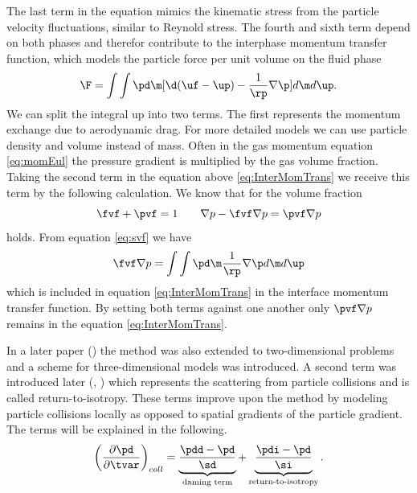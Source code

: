 The last term in the equation mimics the kinematic stress from the particle velocity fluctuations, similar to Reynold stress. The fourth and sixth term depend on both phases and therefor contribute to the interphase momentum transfer function, which models the particle force per unit volume on the fluid phase
\begin{equation}
    \label{eq:InterMomTrans}
    \F = \int \int \pd \m [\d (\uf - \up) - \dfrac{1}{\rp} \nabla \p] d\m d\up.
\end{equation}
We can split the integral up into two terms. The first represents the momentum exchange due to aerodynamic drag.
For more detailed models we can use particle density and volume instead of mass.
Often in the gas momentum equation \eqref{eq:momEul} the pressure gradient is multiplied by the gas volume fraction. Taking the second term in the equation above \eqref{eq:InterMomTrans} we receive this term by the following calculation.
We know that for the volume fraction
\begin{equation}
    \fvf + \pvf = 1 \qquad \nabla p - \fvf \nabla p = \pvf \nabla p
\end{equation}
holds.
From equation \eqref{eq:svf} we have
\begin{equation}
    \fvf \nabla p =  \int \int \pd \m \dfrac{1}{\rp} \nabla \p d\m d\up
\end{equation}
which is included in equation \eqref{eq:InterMomTrans} in the interface momentum transfer function. 
By setting both terms against one another only $\pvf \nabla p$ remains in the equation \eqref{eq:InterMomTrans}.



In a later paper (\cite{MPInterpolation}) the \MP method was also extended to two-dimensional problems and a scheme for three-dimensional models was introduced. 
A second term  was introduced later (\cite{damp}, \cite{isotropy})  which represents the scattering from particle collisions and is called return-to-isotropy.
These terms improve upon the \MP method by modeling particle collisions locally as opposed to spatial gradients of the particle gradient.
The terms will be explained in the following.
\begin{equation}
    \left( \frac{\partial \pd}{\partial \tvar} \right)_{coll} = \underbrace{\dfrac{\pdd - \pd}{\sd}}_{\text{daming term}} + \underbrace{\dfrac{\pdi - \pd}{\si}}_{\text{return-to-isotropy}}.
\end{equation}


